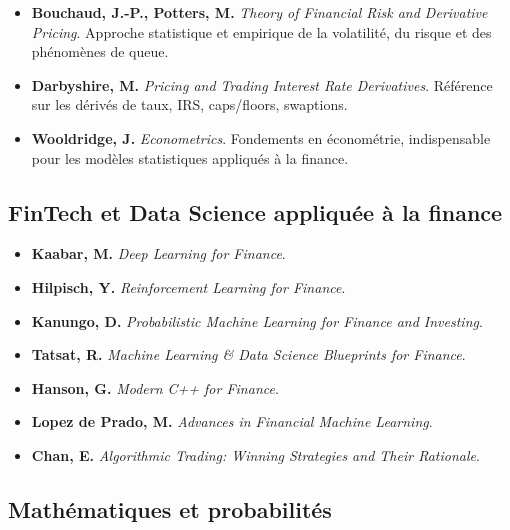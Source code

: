 \documentclass[11pt,a4paper]{article}
\newcommand{\1}{\mathbf{1}}
\begin{document}
\begin{itemize}
  \item \textbf{Bouchaud, J.-P., Potters, M.}
        \emph{Theory of Financial Risk and Derivative Pricing}.
        Approche statistique et empirique de la volatilité, du risque et des
        phénomènes de queue.

  \item \textbf{Darbyshire, M.}
        \emph{Pricing and Trading Interest Rate Derivatives}.
        Référence sur les dérivés de taux, IRS, caps/floors, swaptions.

  \item \textbf{Wooldridge, J.}
        \emph{Econometrics}.
        Fondements en économétrie, indispensable pour les modèles statistiques
        appliqués à la finance.
\end{itemize}

\subsection{FinTech et Data Science appliquée à la finance}

\begin{itemize}
  \item \textbf{Kaabar, M.}
        \emph{Deep Learning for Finance}.

  \item \textbf{Hilpisch, Y.}
        \emph{Reinforcement Learning for Finance}.

  \item \textbf{Kanungo, D.}
        \emph{Probabilistic Machine Learning for Finance and Investing}.

  \item \textbf{Tatsat, R.}
        \emph{Machine Learning \& Data Science Blueprints for Finance}.

  \item \textbf{Hanson, G.}
        \emph{Modern C++ for Finance}.

  \item \textbf{Lopez de Prado, M.}
        \emph{Advances in Financial Machine Learning}.

  \item \textbf{Chan, E.}
        \emph{Algorithmic Trading: Winning Strategies and Their Rationale}.
\end{itemize}

\subsection{Mathématiques et probabilités}
\end{document}
